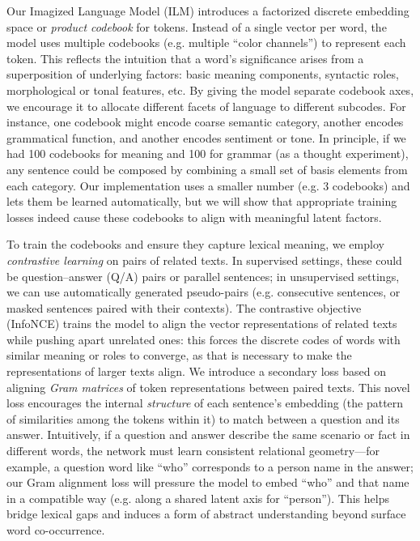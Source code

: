 \documentclass[10pt,twocolumn]{article}
\begin{document}
Our Imagized Language Model (ILM) introduces a factorized discrete embedding space or \emph{product codebook} for tokens. Instead of a single vector per word, the model uses multiple codebooks (e.g. multiple ``color channels'') to represent each token. This reflects the intuition that a word's significance arises from a superposition of underlying factors: basic meaning components, syntactic roles, morphological or tonal features, etc. By giving the model separate codebook axes, we encourage it to allocate different facets of language to different subcodes. For instance, one codebook might encode coarse semantic category, another encodes grammatical function, and another encodes sentiment or tone. In principle, if we had 100 codebooks for meaning and 100 for grammar (as a thought experiment), any sentence could be composed by combining a small set of basis elements from each category. Our implementation uses a smaller number (e.g. 3 codebooks) and lets them be learned automatically, but we will show that appropriate training losses indeed cause these codebooks to align with meaningful latent factors.

To train the codebooks and ensure they capture lexical meaning, we employ \emph{contrastive learning} on pairs of related texts. In supervised settings, these could be question--answer (Q/A) pairs or parallel sentences; in unsupervised settings, we can use automatically generated pseudo-pairs (e.g. consecutive sentences, or masked sentences paired with their contexts). The contrastive objective (InfoNCE) trains the model to align the vector representations of related texts while pushing apart unrelated ones: this forces the discrete codes of words with similar meaning or roles to converge, as that is necessary to make the representations of larger texts align. We introduce a secondary loss based on aligning \emph{Gram matrices} of token representations between paired texts. This novel loss encourages the internal \textit{structure} of each sentence's embedding (the pattern of similarities among the tokens within it) to match between a question and its answer. Intuitively, if a question and answer describe the same scenario or fact in different words, the network must learn consistent relational geometry---for example, a question word like ``who'' corresponds to a person name in the answer; our Gram alignment loss will pressure the model to embed ``who'' and that name in a compatible way (e.g. along a shared latent axis for ``person''). This helps bridge lexical gaps and induces a form of abstract understanding beyond surface word co-occurrence.
\end{document}
